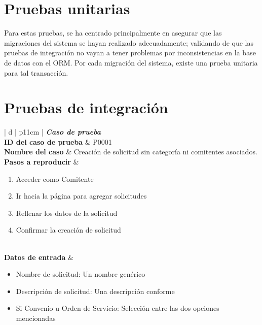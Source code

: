 \section{Pruebas unitarias}
\normalsize{\indent
Para estas pruebas, se ha centrado principalmente
en asegurar que las migraciones del sistema se
hayan realizado adecuadamente; validando de que
las pruebas de integraci\'on no vayan a tener
problemas por inconsistencias en la base de datos
con el ORM. Por cada migraci\'on del sistema,
existe una prueba unitaria para tal transacci\'on.
}
\section{Pruebas de integraci\'on}
\begin{center}
\begin{tabular}{ | d | p{11cm} | }
	\hline
	{\textbf{\textit{Caso de prueba}}} \\
	\hline
	\raggedleft \textbf{ID del caso de prueba} &
	P0001 \\
	\hline
	\raggedleft \textbf{Nombre del caso} &
	Creaci\'on de solicitud sin categor\'ia ni
	comitentes asociados. \\
	\hline
	\raggedleft \textbf{Pasos a reproducir} &
	\vspace{-0.9cm}
	\begin{minipage}[t][2cm][t]{11cm}
		\begin{enumerate}
			\item Acceder como Comitente
			\item Ir hacia la p\'agina para agregar solicitudes
			\item Rellenar los datos de la solicitud
			\item Confirmar la creaci\'on de solicitud
		\end{enumerate}
    \end{minipage} \\
	\hline
	\raggedleft \textbf{Datos de entrada} &
	\begin{minipage}[t][2cm][t]{11cm}
		\begin{itemize}[noitemsep,nosep]
			\item Nombre de solicitud: Un nombre gen\'erico
    		\item Descripci\'on de solicitud: Una descripci\'on
    		conforme
    		\item Si Convenio u Orden de Servicio: Selecci\'on
    		entre las dos opciones mencionadas
		\end{itemize}

\end{minipage}
\end{tabular}
\end{center}
